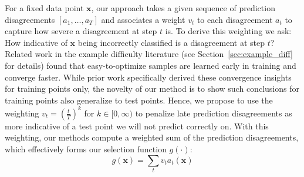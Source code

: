 

For a fixed data point $\bm{x}$, our approach takes a given sequence of prediction disagreements $[a_1,\ldots,a_T]$ and associates a weight $v_t$ to each disagreement $a_t$ to capture how severe a disagreement at step $t$ is. To derive this weighting we ask: How indicative of $\bm{x}$ being incorrectly classified is a disagreement at step $t$? Related work in the example difficulty literature (see Section~\ref{sec:example_diff} for details) found that easy-to-optimize samples are learned early in training and converge faster. While prior work specifically derived these convergence insights for training points only, the novelty of our method is to show such conclusions for training points also generalize to test points. Hence, we propose to use the weighting $v_t = (\frac{t}{T})^k$ for $k \in [0,\infty)$ to penalize late prediction disagreements as more indicative of a test point we will not predict correctly on. With this weighting, our methods compute a weighted sum of the prediction disagreements, which effectively forms our selection function $g(\cdot)$: %
\begin{equation}
    \label{eq:score}
    g(\bm{x}) = \sum_{t} v_t a_t(\bm{x})    
\end{equation}

